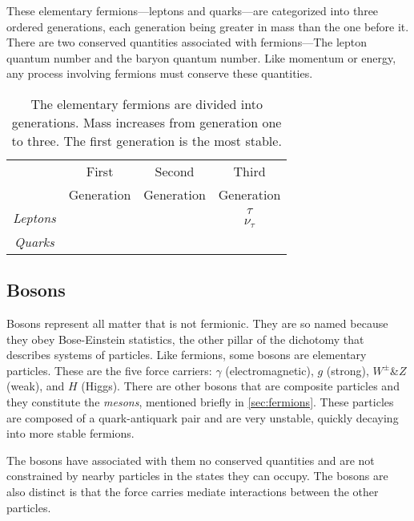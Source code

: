	These elementary fermions---leptons and quarks---are categorized into three ordered generations, each generation being greater in mass than the one before it. There are two conserved quantities associated with fermions---The lepton quantum number and the baryon quantum number. Like momentum or energy, any process involving fermions must conserve these quantities. 

	\begin{table}[H]
		\centering
		\captionsetup{width=4in}
		\caption[The Elemenetary Fermions]{The elementary fermions are divided into generations. Mass increases from generation one to three. The first generation is the most stable.}
		\label{table:leptons}
		\begin{tabular}{cccc}
			\toprule
			 & First & Second & Third \\
			 & Generation & Generation & Generation \\
			\midrule
			\multirow{2}{*}{\emph{Leptons}} & \HepParticle{\Pelectron} & \HepParticle{\Pmu} & $\tau$ \\ 
			 & \HepParticle{\Pnue} & \HepParticle{\Pnum} & $\nu_{\tau}$ \\
			\midrule
			\multirow{2}{*}{\emph{Quarks}} & \HepParticle{\Pup}{}{} & \HepParticle{\Pcharm}{}{} & \HepParticle{\Ptop}{}{} \\
			 & \HepParticle{\Pdown}{}{} & \HepParticle{\Pstrange}{}{} & \HepParticle{\Pbottom}{}{} \\
			\bottomrule
		\end{tabular}
	\end{table}

	\subsection{Bosons}
	\label{sec:bosons}
	Bosons represent all matter that is not fermionic. They are so named because they obey Bose-Einstein statistics, the other pillar of the dichotomy that describes systems of particles. Like fermions, some bosons are elementary particles. These are the five force carriers: $\gamma$ (electromagnetic), $g$ (strong), $W^{\pm}$\&$Z$ (weak), and $H$ (Higgs). There are other bosons that are composite particles and they constitute the \emph{mesons}, mentioned briefly in \SEC \ref{sec:fermions}. These particles are composed of a quark-antiquark pair and are very unstable, quickly decaying into more stable fermions.

	The bosons have associated with them no conserved quantities and are not constrained by nearby particles in the states they can occupy. The bosons are also distinct is that the force carries mediate interactions between the other particles. 

